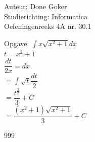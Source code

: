 \documentclass[a4paper]{article}
\begin{document}
  
\noindent \large Auteur: Done Goker \\
\noindent \large Studierichting: Informatica\\
\noindent \large Oefeningenreeks 4A nr. 30.1\\

\medskip

\normalsize

Opgave:
$\displaystyle\int x \sqrt{x^2 + 1} dx$ \\

$t= x^2 + 1$ \\

$\dfrac{dt}{2x} = dx$ \\

$=\displaystyle\int \sqrt{t} \dfrac{dt}{2} $ \\

$= \dfrac {t^{\tfrac{3}{2}}} {3} + C$ \\

$= \dfrac {(x^2 +1)\sqrt{x^2 +1}} {3} +C$

\begin{thebibliography}{999}
\end{thebibliography}
\end{document}
